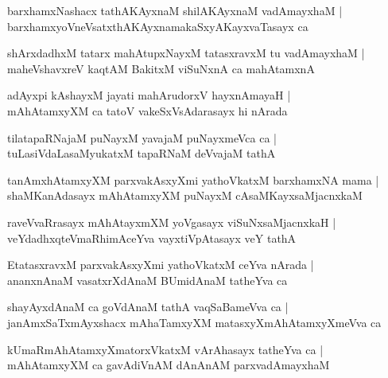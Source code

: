 \documentclass[twoside,12pt,openright]{book}
\newcounter{shloka}[chapter]
\begin{document}
\begin{shloka}%
barxhamxNashacx tathAKAyxnaM shilAKAyxnaM vadAmayxhaM |\\
barxhamxyoVneVsatxthAKAyxnamakaSxyAKayxvaTasayx ca 
\end{shloka}

\begin{shloka}%
shArxdadhxM tatarx mahAtupxNayxM tatasxravxM tu vadAmayxhaM |\\
maheVshavxreV kaqtAM BakitxM viSuNxnA ca mahAtamxnA 
\end{shloka}

\begin{shloka}%
adAyxpi kAshayxM jayati mahArudorxV hayxnAmayaH |\\
mAhAtamxyXM ca tatoV vakeSxVsAdarasayx hi nArada 
\end{shloka}

\begin{shloka}%
tilatapaRNajaM puNayxM yavajaM puNayxmeVca ca |\\
tuLasiVdaLasaMyukatxM tapaRNaM deVvajaM tathA 
\end{shloka}

\begin{shloka}%
tanAmxhAtamxyXM parxvakAsxyXmi yathoVkatxM barxhamxNA mama |\\
shaMKanAdasayx mAhAtamxyXM puNayxM cAsaMKayxsaMjacnxkaM 
\end{shloka}

\begin{shloka}%
raveVvaRrasayx mAhAtayxmXM yoVgasayx viSuNxsaMjacnxkaH |\\
veYdadhxqteVmaRhimAceYva vayxtiVpAtasayx veY tathA 
\end{shloka}

\begin{shloka}%
EtatasxravxM parxvakAsxyXmi yathoVkatxM ceYva nArada |\\
ananxnAnaM vasatxrXdAnaM BUmidAnaM tatheYva ca 
\end{shloka}

\begin{shloka}%
shayAyxdAnaM ca goVdAnaM tathA vaqSaBameVva ca |\\
janAmxSaTxmAyxshacx mAhaTamxyXM matasxyXmAhAtamxyXmeVva ca 
\end{shloka}

\begin{shloka}%
kUmaRmAhAtamxyXmatorxVkatxM vArAhasayx tatheYva ca |\\
mAhAtamxyXM ca gavAdiVnAM dAnAnAM parxvadAmayxhaM 
\end{shloka}
\end{document}
